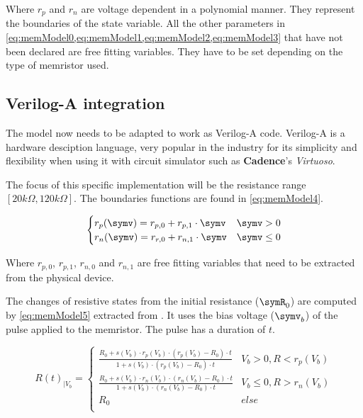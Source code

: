 Where $r_p$ and $r_n$ are voltage dependent in a polynomial manner. They represent the boundaries of the state variable. All the other parameters in \cref{eq:memModel0,eq:memModel1,eq:memModel2,eq:memModel3} that have not been declared are free fitting variables. They have to be set depending on the type of memristor used.

\subsection{Verilog-A integration}

The model now needs to be adapted to work as Verilog-A code.
Verilog-A is a hardware desciption language, very popular in the industry for its simplicity and flexibility when using it with circuit simulator such as \textbf{Cadence}'s \textit{Virtuoso}.

The focus of this specific implementation will be the resistance range $[20k\Omega, 120k\Omega]$. The boundaries functions are found in \cref{eq:memModel4}.

\begin{equation}\label{eq:memModel4}
  \begin{cases}
    r_p(\symv)= r_{p,0} + r_{p,1}\cdot \symv& \symv>0\\
    r_n(\symv)= r_{r,0} + r_{n,1}\cdot \symv& \symv\le 0\\
  \end{cases}
\end{equation}

Where $r_{p,0}$, $r_{p,1}$, $r_{n,0}$ and $r_{n,1}$ are free fitting variables that need to be extracted from the physical device.

The changes of resistive states from the initial resistance ($\symR_0$) are computed by \cref{eq:memModel5} extracted from \cite{memCadenceModel}. It uses the bias voltage ($\symv_b$) of the pulse applied to the memristor. The pulse has a duration of $t$.

\begin{equation}\label{eq:memModel5}
  R(t)_{|V_b} =
  \begin{cases}
    \frac{R_0+s(V_b)\cdot r_p(V_b)\cdot(r_p(V_b)-R_0)\cdot t}{1+s(V_b)\cdot (r_p(V_b)-R_0)\cdot t} & V_b>0, R<r_p(V_b)\\
    \frac{R_0+s(V_b)\cdot r_n(V_b)\cdot(r_n(V_b)-R_0)\cdot t}{1+s(V_b)\cdot (r_n(V_b)-R_0)\cdot t} & V_b\le 0, R>r_n(V_b)\\
    R_0 & else\\
  \end{cases}
\end{equation}

